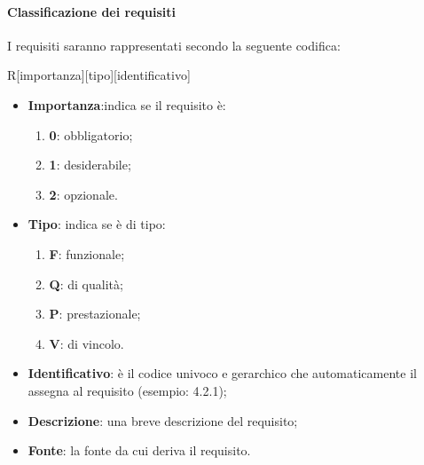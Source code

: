 	\paragraph{Classificazione  dei requisiti}
	\label{sec:2.1.2.1}
		I requisiti saranno rappresentati secondo la seguente codifica:
		\begin{center}
			R[importanza][tipo][identificativo]
		\end{center}
		\begin{itemize}
			\item \textbf{Importanza}:indica se il requisito è:
			\begin{enumerate}
				\item \textbf{0}: obbligatorio;
				\item \textbf{1}: desiderabile;
				\item \textbf{2}: opzionale.
			\end{enumerate}
			\item \textbf{Tipo}: indica se è di tipo:
			\begin{enumerate}
				\item \textbf{F}: funzionale;
				\item \textbf{Q}: di qualità;
				\item \textbf{P}: prestazionale;
				\item \textbf{V}: di vincolo.
			\end{enumerate}
			\item \textbf{Identificativo}: è il codice univoco e gerarchico che automaticamente il  assegna al requisito (esempio: 4.2.1);
			\item \textbf{Descrizione}: una breve descrizione del requisito;
			\item \textbf{Fonte}: la fonte da cui deriva il requisito.
		\end{itemize}
